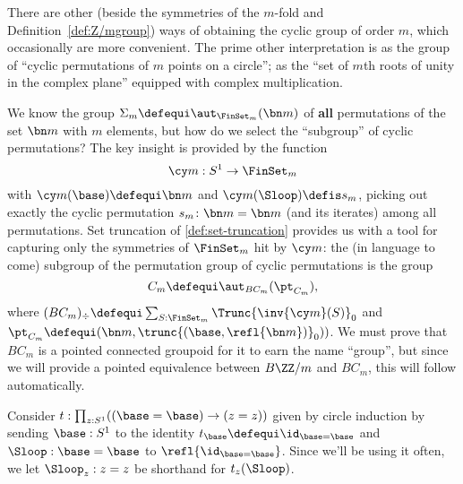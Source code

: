 \begin{example}
\label{ex:Cm}
There are other (beside the symmetries of the $m$-fold \covering and Definition~\ref{def:Z/mgroup}) ways of obtaining the cyclic group of order $m$, which occasionally are more convenient.  The prime other interpretation is as the group of ``cyclic permutations of $m$ points on a circle''; \ie as the ``set of $m$th roots of unity in the complex plane'' equipped with complex multiplication.

We know the group $\Sigma_m\defequi\aut_{\FinSet_m}(\bn m)$ of {\bf all} permutations of the set $\bn m$ with $m$ elements, but how do we select the ``subgroup'' of cyclic permutations?
The key insight is provided by the function
\begin{displaymath}
  \cy m:S^1\to\FinSet_m
\end{displaymath}
with $\cy m(\base)\defequi\bn m$ and
$\cy m(\Sloop)\defis s_m$, picking out exactly the cyclic permutation $s_m\colon\bn m=\bn m$ (and its iterates) among all permutations.  Set truncation of \cref{def:set-truncation} provides us with a tool for capturing only the symmetries of $\FinSet_m$ hit by $\cy m$: the (in language to come) subgroup of the permutation group of cyclic permutations is the group
$$C_m\defequi\aut_{BC_m}(\pt_{C_m}),$$
where $(BC_m)_\div\defequi \sum_{S:\FinSet_m}\Trunc{\inv{\cy m}(S)}_0$ and $\pt_{C_m}\defequi (\bn m,\trunc{(\base,\refl{\bn m})}_0))$.  We must prove that $BC_m$ is a pointed connected groupoid for it to earn the name ``group'', but since we will provide a pointed equivalence between $B\ZZ/m$ and $BC_m$, this will follow automatically.


Consider $t:\prod_{z:S^1}((\base=\base)\to(z=z))$ given by circle induction by sending $\base:S^1$ to the identity $t_\base\defequi\id_{\base=\base}$ and $\Sloop:\base=\base$ to $\refl{\id_{\base=\base}}$.
Since we'll be using it often, we let $\Sloop_z:z=z$ be shorthand for $t_z(\Sloop)$.


\end{example}

